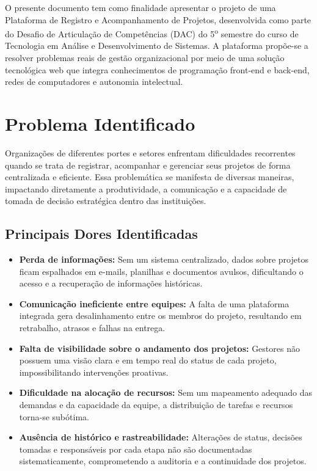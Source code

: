 \documentclass[a4paper,12pt,oneside]{article}
\begin{document}
O presente documento tem como finalidade apresentar o projeto de uma Plataforma de Registro e Acompanhamento de Projetos, desenvolvida como parte do Desafio de Articulação de Competências (DAC) do 5\textsuperscript{o} semestre do curso de Tecnologia em Análise e Desenvolvimento de Sistemas. A plataforma propõe-se a resolver problemas reais de gestão organizacional por meio de uma solução tecnológica web que integra conhecimentos de programação front-end e back-end, redes de computadores e autonomia intelectual.

\section{Problema Identificado}

Organizações de diferentes portes e setores enfrentam dificuldades recorrentes quando se trata de registrar, acompanhar e gerenciar seus projetos de forma centralizada e eficiente. Essa problemática se manifesta de diversas maneiras, impactando diretamente a produtividade, a comunicação e a capacidade de tomada de decisão estratégica dentro das instituições.

\subsection{Principais Dores Identificadas}

\begin{itemize}[leftmargin=2cm]
  \item \textbf{Perda de informações:} Sem um sistema centralizado, dados sobre projetos ficam espalhados em e-mails, planilhas e documentos avulsos, dificultando o acesso e a recuperação de informações históricas.
  \item \textbf{Comunicação ineficiente entre equipes:} A falta de uma plataforma integrada gera desalinhamento entre os membros do projeto, resultando em retrabalho, atrasos e falhas na entrega.
  \item \textbf{Falta de visibilidade sobre o andamento dos projetos:} Gestores não possuem uma visão clara e em tempo real do status de cada projeto, impossibilitando intervenções proativas.
  \item \textbf{Dificuldade na alocação de recursos:} Sem um mapeamento adequado das demandas e da capacidade da equipe, a distribuição de tarefas e recursos torna-se subótima.
  \item \textbf{Ausência de histórico e rastreabilidade:} Alterações de status, decisões tomadas e responsáveis por cada etapa não são documentadas sistematicamente, comprometendo a auditoria e a continuidade dos projetos.
\end{itemize}
\end{document}
